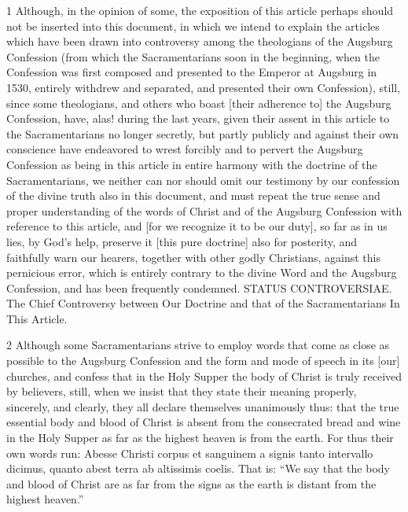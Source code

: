 1 Although, in the opinion of some, the exposition of this article perhaps should not be inserted into this document, in which we intend to explain the articles which have been drawn into controversy among the theologians of the Augsburg Confession (from which the Sacramentarians soon in the beginning, when the Confession was first composed and presented to the Emperor at Augsburg in 1530, entirely withdrew and separated, and presented their own Confession), still, since some theologians, and others who boast [their adherence to] the Augsburg Confession, have, alas! during the last years, given their assent in this article to the Sacramentarians no longer secretly, but partly publicly and against their own conscience have endeavored to wrest forcibly and to pervert the Augsburg Confession as being in this article in entire harmony with the doctrine of the Sacramentarians, we neither can nor should omit our testimony by our confession of the divine truth also in this document, and must repeat the true sense and proper understanding of the words of Christ and of the Augsburg Confession with reference to this article, and [for we recognize it to be our duty], so far as in us lies, by God’s help, preserve it [this pure doctrine] also for posterity, and faithfully warn our hearers, together with other godly Christians, against this pernicious error, which is entirely contrary to the divine Word and the Augsburg Confession, and has been frequently condemned.
STATUS CONTROVERSIAE.
The Chief Controversy between Our Doctrine and that of the Sacramentarians In This Article.

2 Although some Sacramentarians strive to employ words that come as close as possible to the Augsburg Confession and the form and mode of speech in its [our] churches, and confess that in the Holy Supper the body of Christ is truly received by believers, still, when we insist that they state their meaning properly, sincerely, and clearly, they all declare themselves unanimously thus: that the true essential body and blood of Christ is absent from the consecrated bread and wine in the Holy Supper as far as the highest heaven is from the earth. For thus their own words run: Abesse Christi corpus et sanguinem a signis tanto intervallo dicimus, quanto abest terra ab altissimis coelis. That is: “We say that the body and blood of Christ are as far from the signs as the earth is distant from the highest heaven.”

